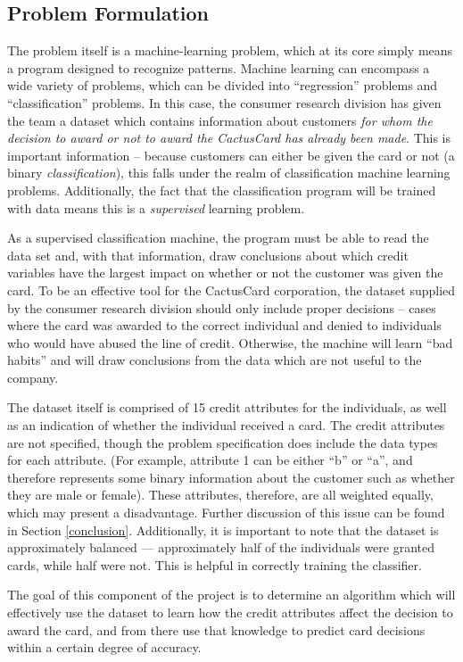 \documentclass[11pt,journal]{IEEEtran}
\begin{document}
\subsection{Problem Formulation}
The problem itself is a machine-learning problem, which at its core simply means a program designed to recognize patterns. Machine learning can encompass a wide variety of problems, which can be divided into ``regression'' problems and ``classification'' problems. In this case, the consumer research division has given the team a dataset which contains information about customers \emph{for whom the decision to award or not to award the CactusCard has already been made}. This is important information -- because customers can either be given the card or not (a binary \emph{classification}), this falls under the realm of classification machine learning problems. Additionally, the fact that the classification program will be trained with data means this is a \emph{supervised} learning problem.
\par
As a supervised classification machine, the program must be able to read the data set and, with that information, draw conclusions about which credit variables have the largest impact on whether or not the customer was given the card. To be an effective tool for the CactusCard corporation, the dataset supplied by the consumer research division should only include proper decisions -- cases where the card was awarded to the correct individual and denied to individuals who would have abused the line of credit. Otherwise, the machine will learn ``bad habits'' and will draw conclusions from the data which are not useful to the company.
\par
The dataset itself is comprised of 15 credit attributes for the individuals, as well as an indication of whether the individual received a card. The credit attributes are not specified, though the problem specification does include the data types for each attribute. (For example, attribute 1 can be either ``b'' or ``a'', and therefore represents some binary information about the customer such as whether they are male or female). These attributes, therefore, are all weighted equally, which may present a disadvantage. Further discussion of this issue can be found in Section \ref{conclusion}. Additionally, it is important to note that the dataset is approximately balanced --- approximately half of the individuals were granted cards, while half were not. This is helpful in correctly training the classifier.
\par
The goal of this component of the project is to determine an algorithm which will effectively use the dataset to learn how the credit attributes affect the decision to award the card, and from there use that knowledge to predict card decisions within a certain degree of accuracy.
\end{document}
